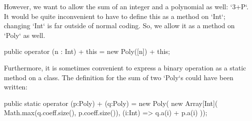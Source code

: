 However, we want to allow the sum of an integer and a polynomial as well:
\xcd`3+P`.  It would be quite inconvenient to have to define this as a method
on \xcd`Int`; changing \xcd`Int` is far outside of normal coding.  So, we
allow it as a method on \xcd`Poly` as well.


% 
\begin{xten}
   public operator (n : Int) + this = new Poly([n]) + this;
\end{xten}
% 
%     

Furthermore, it is sometimes convenient to express a binary operation as a
static method on a class. 
The definition for the sum of two
\xcd`Poly`s could have been written:
\begin{xten}
  public static operator (p:Poly) + (q:Poly) =  new Poly(
     new Array[Int](
        Math.max(q.coeff.size(), p.coeff.size()),
        (i:Int) => q.a(i) + p.a(i)
     ));
\end{xten}
%
% 
%     

